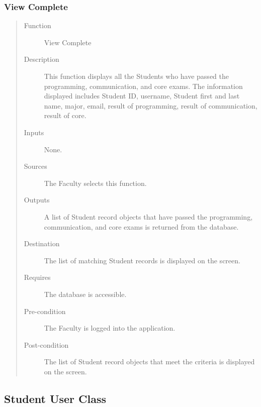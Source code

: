 \subsubsection{View Complete}  
\begin{quote} %
\begin{description}
\item[Function]
   View Complete
\item[Description]
   This function displays all the Students who have passed the programming,
   communication, and core exams. The information displayed includes Student ID,
   username, Student first and last name, major, email, result of programming,
   result of communication, result of core.
\item[Inputs]
   None.
\item[Sources]
   The Faculty selects this function.
\item[Outputs]
   A list of Student record objects that have passed the programming,
   communication, and core exams is returned from the database.
\item[Destination]
   The list of matching Student records is displayed on the screen.
\item[Requires]
   The database is accessible.
\item[Pre-condition]
   The Faculty is logged into the application.
\item[Post-condition]
   The list of Student record objects that meet the criteria is displayed on the
   screen.
\end{description}
\end{quote} %

\subsection{Student User Class}
